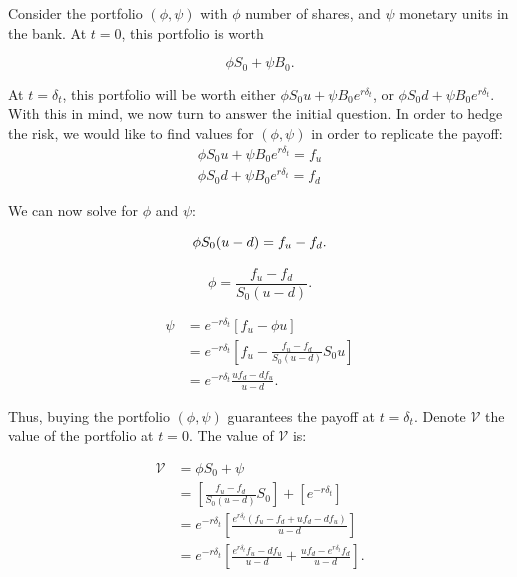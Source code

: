 \documentclass[../TGMAFFIRO.tex]{subfiles}
\begin{document}
Consider the portfolio $(\phi, \psi)$ with $\phi$ number of shares, and $\psi$ monetary units in the bank. At $t=0$, this portfolio is worth

\[
    \phi S_0 + \psi B_0.
\]

At $t=\delta_t$, this portfolio will be worth either $\phi S_0u + \psi B_0e^{r \delta_t}$, or $\phi S_0d + \psi B_0e^{r \delta_t}$.\\

With this in mind, we now turn to answer the initial question. In order to hedge the risk, we would like to find values for $(\phi, \psi)$ in order to replicate the payoff:
\begin{align*}
    \phi S_0u + \psi B_0e^{r \delta_t} = f_u\\
    \phi S_0d + \psi B_0e^{r \delta_t} = f_d
\end{align*}

We can now solve for $\phi$ and $\psi$:

\begin{equation*}
    \phi S_0(u - d) = f_u - f_d.\\
\end{equation*}

\begin{equation} \label{eq:phi}
    \phi = \frac{f_u - f_d}{S_0(u-d)}.
\end{equation}

\begin{align*}
    \psi &= e^{-r\delta_t} [f_u - \phi u]\\
         &= e^{-r\delta_t} \left[f_u - \frac{f_u - f_d}{S_0(u - d)} S_0u\right]\\
         &= e^{-r\delta_t} \frac{uf_d - df_u}{u -d}.
\end{align*}

Thus, buying the portfolio $(\phi, \psi)$ guarantees the payoff at $t=\delta_t$. Denote $\mathcal{V}$ the value of the portfolio at $t=0$. The value of $\mathcal{V}$ is:

\begin{align*}
    \mathcal{V} &= \phi S_0 + \psi\\
                &= \left[\frac{f_u - f_d}{S_0(u - d)}S_0\right] + \left[e^{-r\delta_t}\right]\\
                &= e^{-r\delta_t}\left[\frac{e^{r\delta_t}(f_u - f_d + uf_d - df_u)}{u - d}\right]\\
                &= e^{-r\delta_t}\left[\frac{e^{r\delta_t}f_u - df_u}{u-d} + \frac{uf_d - e^{r\delta_t}f_d}{u-d}\right].
\end{align*}
\end{document}
